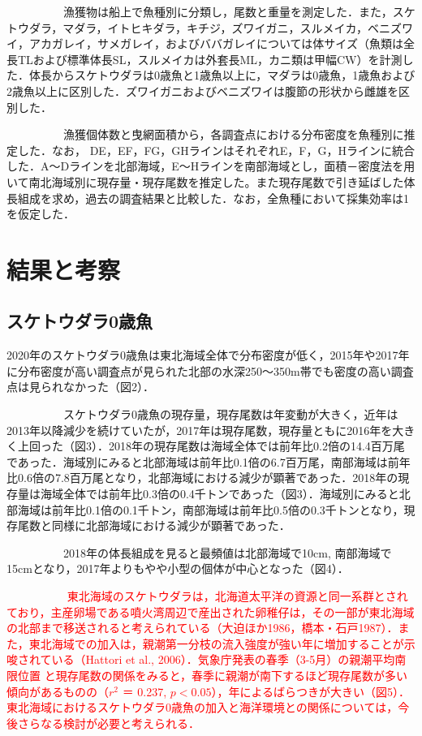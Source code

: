 \documentclass[11pt]{article} %
\begin{document}
\begin{linenumbers}
\ \ \ \ \ \ \ \ \ \ 
漁獲物は船上で魚種別に分類し，尾数と重量を測定した．また，スケトウダラ，マダラ，イトヒキダラ，キチジ，ズワイガニ，スルメイカ，ベニズワイ，アカガレイ，サメガレイ，およびババガレイについては体サイズ（魚類は全長TLおよび標準体長SL，スルメイカは外套長ML，カニ類は甲幅CW）を計測した．体長からスケトウダラは0歳魚と1歳魚以上に，マダラは0歳魚，1歳魚および2歳魚以上に区別した．ズワイガニおよびベニズワイは腹節の形状から雌雄を区別した．

\ \ \ \ \ \ \ \ \ \ 
漁獲個体数と曳網面積から，各調査点における分布密度を魚種別に推定した．なお， DE，EF，FG，GHラインはそれぞれE，F，G，Hラインに統合した．A～Dラインを北部海域，E～Hラインを南部海域とし，面積－密度法を用いて南北海域別に現存量・現存尾数を推定した。また現存尾数で引き延ばした体長組成を求め，過去の調査結果と比較した．なお，全魚種において採集効率は1を仮定した．


\section{結果と考察}
\subsection{スケトウダラ0歳魚}
2020年のスケトウダラ0歳魚は東北海域全体で分布密度が低く，2015年や2017年に分布密度が高い調査点が見られた北部の水深250～350m帯でも密度の高い調査点は見られなかった（図2）．

\ \ \ \ \ \ \ \ \ \ 
スケトウダラ0歳魚の現存量，現存尾数は年変動が大きく，近年は2013年以降減少を続けていたが，2017年は現存尾数，現存量ともに2016年を大きく上回った（図3）．2018年の現存尾数は海域全体では前年比0.2倍の14.4百万尾であった．海域別にみると北部海域は前年比0.1倍の6.7百万尾，南部海域は前年比0.6倍の7.8百万尾となり，北部海域における減少が顕著であった．2018年の現存量は海域全体では前年比0.3倍の0.4千トンであった（図3）．海域別にみると北部海域は前年比0.1倍の0.1千トン，南部海域は前年比0.5倍の0.3千トンとなり，現存尾数と同様に北部海域における減少が顕著であった．

\ \ \ \ \ \ \ \ \ \ 
2018年の体長組成を見ると最頻値は北部海域で10cm, 南部海域で15cmとなり，2017年よりもやや小型の個体が中心となった（図4）．

\ \ \ \ \ \ \ \ \ \ 
\textcolor{red}{
東北海域のスケトウダラは，北海道太平洋の資源と同一系群とされており，主産卵場である噴火湾周辺で産出された卵稚仔は，その一部が東北海域の北部まで移送されると考えられている（大迫ほか1986，橋本・石戸1987）．また，東北海域での加入は，親潮第一分枝の流入強度が強い年に増加することが示唆されている（Hattori et al., 2006）．気象庁発表の春季（3-5月）の親潮平均南限位置
と現存尾数の関係をみると，春季に親潮が南下するほど現存尾数が多い傾向があるものの（$r^{2}$ ＝ 0.237, $p < 0.05$），年によるばらつきが大きい（図5）．東北海域におけるスケトウダラ0歳魚の加入と海洋環境との関係については，今後さらなる検討が必要と考えられる．
}


\end{linenumbers}
\end{document}
